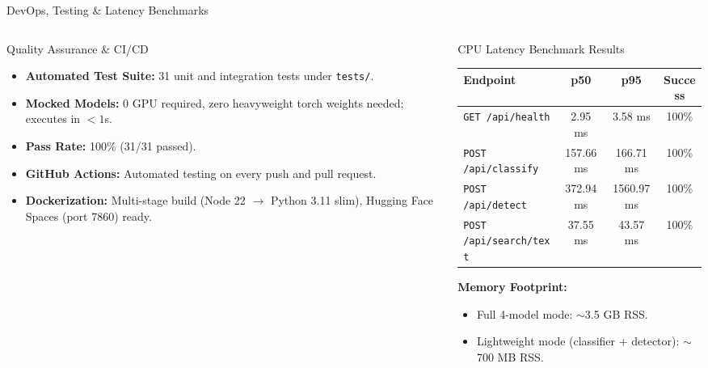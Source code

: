 \documentclass[aspectratio=169, 10pt]{beamer}
\begin{document}
\begin{frame}{DevOps, Testing \& Latency Benchmarks}
  \begin{columns}[T]
    \begin{column}{0.48\textwidth}
      \begin{block}{Quality Assurance \& CI/CD}
        \begin{itemize}
          \item \textbf{Automated Test Suite:} 31 unit and integration tests under \texttt{tests/}.
          \item \textbf{Mocked Models:} 0 GPU required, zero heavyweight torch weights needed; executes in $<1$s.
          \item \textbf{Pass Rate:} 100\% (31/31 passed).
          \item \textbf{GitHub Actions:} Automated testing on every push and pull request.
          \item \textbf{Dockerization:} Multi-stage build (Node 22 $\rightarrow$ Python 3.11 slim), Hugging Face Spaces (port 7860) ready.
        \end{itemize}
      \end{block}
    \end{column}

    \begin{column}{0.48\textwidth}
      \begin{block}{CPU Latency Benchmark Results}
        \centering\footnotesize
        \begin{tabular}{lccc}
          \toprule
          \textbf{Endpoint} & \textbf{p50} & \textbf{p95} & \textbf{Success} \\
          \midrule
          \texttt{GET /api/health} & 2.95 ms & 3.58 ms & 100\% \\
          \texttt{POST /api/classify} & 157.66 ms & 166.71 ms & 100\% \\
          \texttt{POST /api/detect} & 372.94 ms & 1560.97 ms & 100\% \\
          \texttt{POST /api/search/text} & 37.55 ms & 43.57 ms & 100\% \\
          \bottomrule
        \end{tabular}

        \vspace{0.2cm}
        \raggedright
        \textbf{Memory Footprint:}
        \begin{itemize}
          \item Full 4-model mode: $\sim$3.5 GB RSS.
          \item Lightweight mode (classifier + detector): $\sim$700 MB RSS.
        \end{itemize}
      \end{block}
    \end{column}
  \end{columns}
\end{frame}
\end{document}
